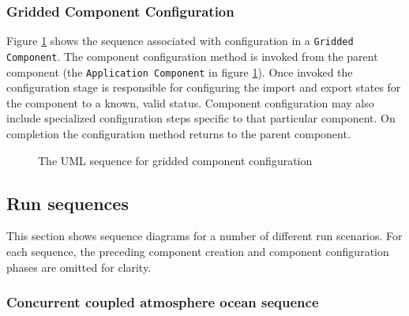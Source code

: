 \subsubsection{Gridded Component Configuration}
Figure \ref{fig:GriddedComponentConfigure} shows the sequence associated 
with configuration in a {\tt Gridded Component}. The component configuration
method is invoked from the parent component (the {\tt Application Component}
in figure \ref{fig:GriddedComponentConfigure}). Once invoked the configuration
stage is responsible for configuring the import and export states for the 
component to a known, valid status. Component configuration may also include
specialized configuration steps specific to that particular
component. On completion the configuration method returns to the
parent component.

\begin{figure}
\caption[{Gridded Component Configuration}]
{The UML sequence for gridded component configuration}
\begin{center}
\label{fig:GriddedComponentConfigure}
\end{center}
\end{figure}

\subsection{Run sequences}
This section shows sequence diagrams for a number of different run scenarios.
For each sequence, the preceding component creation and component configuration 
phases are omitted for clarity.

\subsubsection{Concurrent coupled atmosphere ocean sequence}

